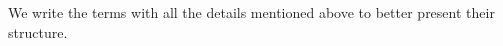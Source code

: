 \documentclass[sn-mathphys, Numbered ,a4paper]{sn-jnl}%
\DeclareMathOperator{\Z}{\mathbb{Z}}
\newcommand{\half}{\frac{1}{2}}
\theoremstyle{plain}
\theoremstyle{definition}
\theoremstyle{remark}
\theoremstyle{plain}
\theoremstyle{definition}
\theoremstyle{remark}
\begin{document}
  We write the terms with all the details mentioned above to better present their structure.
\end{document}
